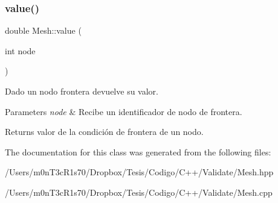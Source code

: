 \subsubsection{\texorpdfstring{value()}{value()}}
{\footnotesize\ttfamily double Mesh\+::value (\begin{DoxyParamCaption}\item[{int}]{node }\end{DoxyParamCaption})\hspace{0.3cm}{\ttfamily [inline]}}



Dado un nodo frontera devuelve su valor. 


\begin{DoxyParams}{Parameters}
{\em node} & Recibe un identificador de nodo de frontera. \\
\hline
\end{DoxyParams}
\begin{DoxyReturn}{Returns}
valor de la condición de frontera de un nodo. 
\end{DoxyReturn}


The documentation for this class was generated from the following files\+:\begin{DoxyCompactItemize}
\item 
/\+Users/m0n\+T3c\+R1s70/\+Dropbox/\+Tesis/\+Codigo/\+C++/\+Validate/Mesh.\+hpp\item 
/\+Users/m0n\+T3c\+R1s70/\+Dropbox/\+Tesis/\+Codigo/\+C++/\+Validate/Mesh.\+cpp\end{DoxyCompactItemize}

